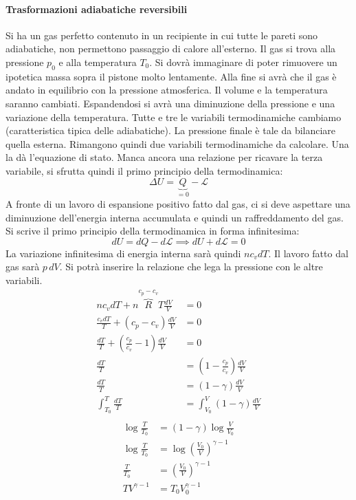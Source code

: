 \documentclass[10pt,a4paper]{book}
\begin{document}
\paragraph{Trasformazioni adiabatiche reversibili} Si ha un gas perfetto contenuto in un recipiente in cui tutte le pareti sono adiabatiche, non permettono passaggio di calore all'esterno. Il gas si trova alla pressione $p_0$ e alla temperatura $T_0$. Si dovrà immaginare di poter rimuovere un ipotetica massa sopra il pistone molto lentamente. Alla fine si avrà che il gas è andato in equilibrio con la pressione atmosferica. Il volume e la temperatura saranno cambiati. Espandendosi si avrà una diminuzione della pressione e una variazione della temperatura. Tutte e tre le variabili termodinamiche cambiamo (caratteristica tipica delle adiabatiche). La pressione finale è tale da bilanciare quella esterna. Rimangono quindi due variabili termodinamiche da calcolare. Una la dà l'equazione di stato. Manca ancora una relazione per ricavare la terza variabile, si sfrutta quindi il primo principio della termodinamica:
\[
	\Delta U = \underbrace{Q}_{=0} - \mathcal{L}
\]
A fronte di un lavoro di espansione positivo fatto dal gas, ci si deve aspettare una diminuzione dell'energia interna accumulata e quindi un raffreddamento del gas. Si scrive il primo principio della termodinamica in forma infinitesima:
\[
	dU = dQ - d\mathcal{L}  \implies dU + d\mathcal{L} = 0
\]
La variazione infinitesima di energia interna sarà quindi $n c_v dT$. Il lavoro fatto dal gas sarà $p\,dV$. Si potrà inserire la relazione che lega la pressione con le altre variabili.
\begin{align*}
	n c_v dT + n\overbrace{R}^{c_p-c_v}T \frac{dV}{V} &= 0 \\
	\frac{c_v dT}{T} + (c_p-c_v)\frac{dV}{V} &= 0 \tag*{dividendo per $nT$} \\
	\frac{dT}{T} + \left(\frac{c_p}{c_v}-1\right)\frac{dV}{V} &= 0 \tag*{dividendo per $c_v$}\\
	\frac{dT}{T} &= \left( 1-\frac{c_p }{c_v} \right) \frac{dV}{V} \\
	\frac{dT}{T} &= \left( 1- \gamma \right) \frac{dV}{V} \\
	\int_{T_0 }^T \frac{dT}{T} &= \int_{V_0 }^V \left( 1- \gamma \right) \frac{dV}{V} \tag*{integrando}\\
\end{align*}
\begin{align*}
	\log \frac{T}{T_0} &= (1-\gamma) \log \frac{V}{V_0} \\
	\log \frac{T}{T_0} &= \log \left(\frac{V_0}{V}\right)^{\gamma-1} \\
	\frac{T}{T_0} &= \left( \frac{V_0}{V} \right)^{\gamma -1} \\
	TV^{\gamma -1} &= T_0 V_0^{\gamma -1}
\end{align*}
\end{document}
